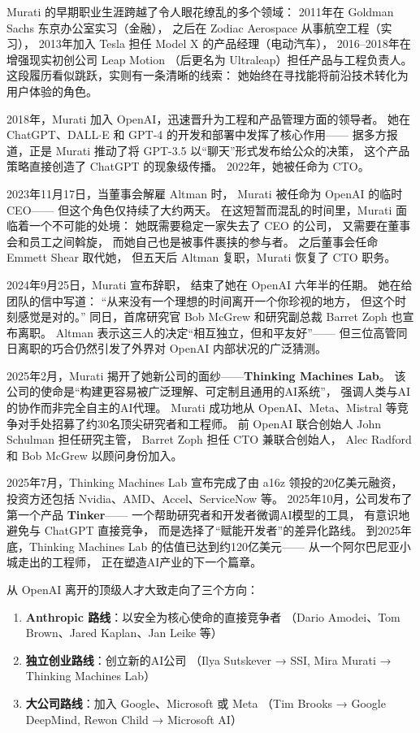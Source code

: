 Murati 的早期职业生涯跨越了令人眼花缭乱的多个领域：
2011年在 Goldman Sachs 东京办公室实习（金融），
之后在 Zodiac Aerospace 从事航空工程（实习），
2013年加入 Tesla 担任 Model X 的产品经理（电动汽车），
2016--2018年在增强现实初创公司 Leap Motion
（后更名为 Ultraleap）担任产品与工程负责人。
这段履历看似跳跃，实则有一条清晰的线索：
她始终在寻找能将前沿技术转化为用户体验的角色。

2018年，Murati 加入 OpenAI，迅速晋升为工程和产品管理方面的领导者。
她在 ChatGPT、DALL$\cdot$E 和 GPT-4 的开发和部署中发挥了核心作用——
据多方报道，正是 Murati 推动了将 GPT-3.5 以``聊天''形式发布给公众的决策，
这个产品策略直接创造了 ChatGPT 的现象级传播。
2022年，她被任命为 CTO。

2023年11月17日，当董事会解雇 Altman 时，
Murati 被任命为 OpenAI 的临时 CEO——
但这个角色仅持续了大约两天。
在这短暂而混乱的时间里，Murati 面临着一个不可能的处境：
她既需要稳定一家失去了 CEO 的公司，
又需要在董事会和员工之间斡旋，
而她自己也是被事件裹挟的参与者。
之后董事会任命 Emmett Shear 取代她，
但五天后 Altman 复职，Murati 恢复了 CTO 职务。

2024年9月25日，Murati 宣布辞职，
结束了她在 OpenAI 六年半的任期。
她在给团队的信中写道：
``从来没有一个理想的时间离开一个你珍视的地方，
但这个时刻感觉是对的。''
同日，首席研究官 Bob McGrew 和研究副总裁 Barret Zoph 也宣布离职。
Altman 表示这三人的决定``相互独立，但和平友好''——
但三位高管同日离职的巧合仍然引发了外界对 OpenAI 内部状况的广泛猜测。

2025年2月，Murati 揭开了她新公司的面纱——\textbf{Thinking Machines Lab}。
该公司的使命是``构建更容易被广泛理解、可定制且通用的AI系统''，
强调人类与AI的协作而非完全自主的AI代理。
Murati 成功地从 OpenAI、Meta、Mistral 等竞争对手处招募了约30名顶尖研究者和工程师。
前 OpenAI 联合创始人 John Schulman 担任研究主管，
Barret Zoph 担任 CTO 兼联合创始人，
Alec Radford 和 Bob McGrew 以顾问身份加入。

2025年7月，Thinking Machines Lab 宣布完成了由 a16z 领投的20亿美元融资，
投资方还包括 Nvidia、AMD、Accel、ServiceNow 等。
2025年10月，公司发布了第一个产品 \textbf{Tinker}——
一个帮助研究者和开发者微调AI模型的工具，
有意识地避免与 ChatGPT 直接竞争，
而是选择了``赋能开发者''的差异化路线。
到2025年底，Thinking Machines Lab 的估值已达到约120亿美元——
从一个阿尔巴尼亚小城走出的工程师，
正在塑造AI产业的下一个篇章。

\begin{keybox}
从 OpenAI 离开的顶级人才大致走向了三个方向：
\begin{enumerate}[noitemsep]
  \item \textbf{Anthropic 路线}：以安全为核心使命的直接竞争者
        （Dario Amodei、Tom Brown、Jared Kaplan、Jan Leike 等）
  \item \textbf{独立创业路线}：创立新的AI公司
        （Ilya Sutskever → SSI, Mira Murati → Thinking Machines Lab）
  \item \textbf{大公司路线}：加入 Google、Microsoft 或 Meta
        （Tim Brooks → Google DeepMind, Rewon Child → Microsoft AI）
\end{enumerate}
\end{keybox}


